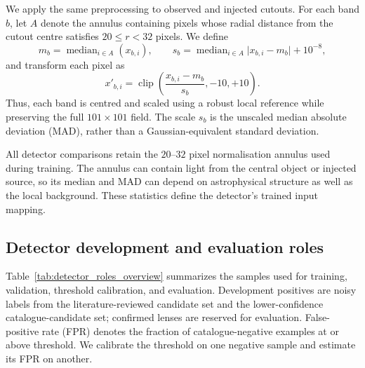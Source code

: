 We apply the same preprocessing to observed and injected cutouts. For each
band $b$, let $A$ denote the annulus containing pixels whose radial distance
from the cutout centre satisfies $20 \leq r < 32$ pixels. We define
\begin{equation}
 m_b = \operatorname{median}_{i \in A}(x_{b,i}), \qquad
 s_b = \operatorname{median}_{i \in A}\lvert x_{b,i}-m_b\rvert + 10^{-8},
\end{equation}
and transform each pixel as
\begin{equation}
 x'_{b,i} =
 \operatorname{clip}\left(\frac{x_{b,i}-m_b}{s_b},-10,+10\right).
\label{eq:raw_robust}
\end{equation}
Thus, each band is centred and scaled using a robust local reference while
preserving the full $101 \times 101$ field. The scale \(s_b\) is the unscaled
median absolute deviation (MAD), rather than a Gaussian-equivalent standard
deviation.

All detector comparisons retain the $20$--$32$ pixel normalisation annulus
used during training. The annulus can contain light from the central object or
injected source, so its median and MAD can depend on astrophysical structure
as well as the local background. These statistics define the detector's
trained input mapping.

\subsection{Detector development and evaluation roles}
\label{sec:data_roles_overview}

Table~\ref{tab:detector_roles_overview} summarizes the samples used for
training, validation, threshold calibration, and evaluation. Development
positives are noisy labels from the literature-reviewed candidate set and the
lower-confidence catalogue-candidate set; confirmed lenses are reserved for
evaluation. False-positive rate (FPR) denotes the fraction of catalogue-negative
examples at or above threshold. We calibrate the threshold
on one negative sample and estimate its FPR on another.

